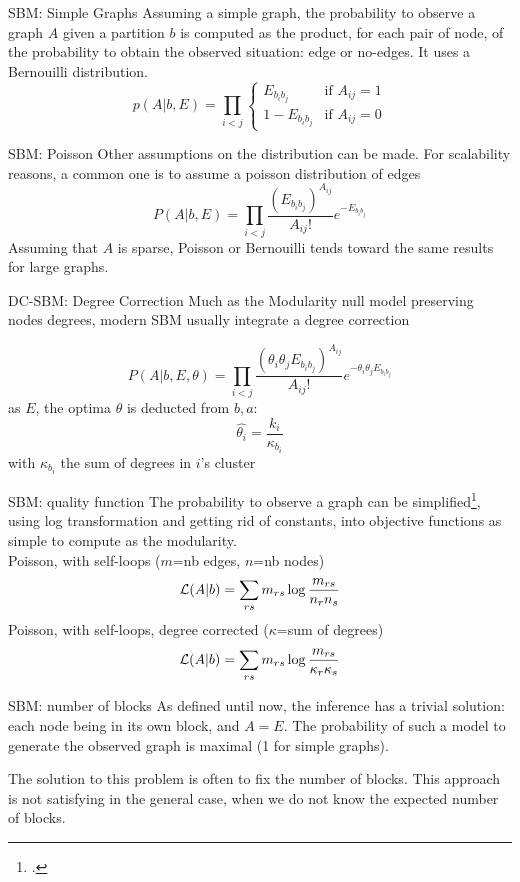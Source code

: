 \documentclass[a4paper,11pt]{book}
\begin{document}
\begin{textbox}{SBM: Simple Graphs}
Assuming a simple graph, the probability to observe a graph $A$ given a partition $b$ is computed as the product, for each pair of node, of the probability to obtain the observed situation: edge or no-edges. It uses a Bernouilli distribution.
\[
p(A|b,E)=\prod_{i<j}\begin{cases} E_{b_i b_j} & \text{if } A_{ij}=1 \\
1- E_{b_i b_j} & \text{if } A_{ij}=0 \end{cases}
\]
\end{textbox}


\begin{textbox}{SBM: Poisson}
Other assumptions on the distribution can be made. For scalability reasons, a common one is to assume a poisson distribution of edges
\[
P(A|b,E)=\prod_{i<j}\frac{(E_{b_ib_j})^{A_{ij}}}{A_{ij}!}e^{-E_{b_ib_j}}
\]
Assuming that $A$ is sparse, Poisson or Bernouilli tends toward the same results for large graphs.
\end{textbox}


\begin{textbox}{DC-SBM: Degree Correction}
Much as the Modularity null model preserving nodes degrees, modern SBM usually integrate a degree correction

\[
P(A|b,E,\theta)=\prod_{i<j}\frac{(\theta_i \theta_j E_{b_ib_j})^{A_{ij}}}{A_{ij}!}e^{-\theta_i \theta_j E_{b_ib_j}}
\]
as $E$, the optima $\theta$ is deducted from $b,a$:
\[
\hat{\theta_i}=\frac{k_i}{\kappa_{b_i}}
\]
with $\kappa_{b_i}$ the sum of degrees in $i$'s cluster
\end{textbox}


\begin{textbox}{SBM: quality function}
The probability to observe a graph can be simplified\footcite{karrer2011stochastic}, using log transformation and getting rid of constants, into objective functions as simple to compute as the modularity.\\
Poisson, with self-loops ($m$=nb edges, $n$=nb nodes)
\[
\mathcal{L}(A|b)=\sum_{rs}m_{rs}\log\frac{m_{rs}}{n_r n_s}{\displaystyle}
\]
Poisson, with self-loops, degree corrected ($\kappa$=sum of degrees)
\[
\mathcal{L}(A|b)=\sum_{rs}m_{rs}\log\frac{m_{rs}}{\kappa_r \kappa_s}{\displaystyle}
\]
\end{textbox}

\begin{textbox}{SBM: number of blocks}
As defined until now, the inference has a trivial solution: each node being in its own block, and $A=E$. The probability of such a model to generate the observed graph is maximal (1 for simple graphs).


The solution to this problem is often to fix the number of blocks. This approach is not satisfying in the general case, when we do not know the expected number of blocks.

\end{textbox}
\end{document}

